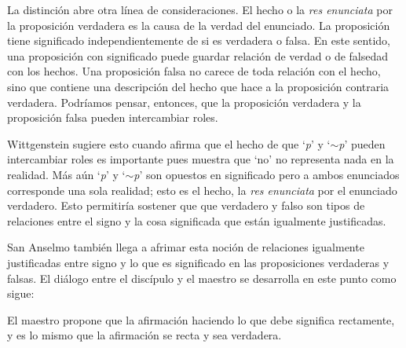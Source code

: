 La distinción abre otra línea de consideraciones. El hecho o la \emph{res
  enunciata} por la proposición verdadera es la causa de la verdad del
enunciado. La proposición tiene significado independientemente de si es
verdadera o falsa. En este sentido, una proposición con significado puede
guardar relación de verdad o de falsedad con los hechos. Una proposición falsa
no carece de toda relación con el hecho, sino que contiene una descripción del
hecho que hace a la proposición contraria verdadera. Podríamos pensar, entonces,
que la proposición verdadera y la proposición falsa pueden intercambiar roles.

Wittgenstein sugiere esto cuando afirma que el hecho de que `\emph{p}' y
`$\sim$\emph{p}' pueden intercambiar roles es importante pues muestra que `no'
no representa nada en la realidad. Más aún `\emph{p}' y `$\sim$\emph{p}' son
opuestos en significado pero a ambos enunciados corresponde una sola realidad;
esto es el hecho, la \emph{res enunciata} por el enunciado verdadero. Esto
permitiría sostener que que verdadero y falso son tipos de relaciones entre el
signo y la cosa significada que están igualmente justificadas.

San Anselmo también llega a afrimar esta noción de relaciones igualmente
justificadas entre signo y lo que es significado en las proposiciones verdaderas
y falsas. El diálogo entre el discípulo y el maestro se desarrolla en este punto
como sigue:

El maestro propone que la afirmación haciendo lo que debe significa rectamente,
y es lo mismo que la afirmación se recta y sea verdadera.

